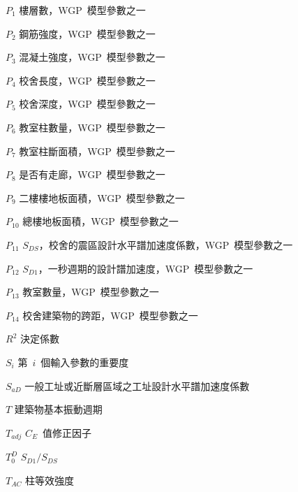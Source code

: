 \begin{SymEntry}
\item[$P_1$]
樓層數，WGP~模型參數之一

\item[$P_2$]
鋼筋強度，WGP~模型參數之一

\item[$P_3$]
混凝土強度，WGP~模型參數之一

\item[$P_4$]
校舍長度，WGP~模型參數之一

\item[$P_5$]
校舍深度，WGP~模型參數之一

\item[$P_6$]
教室柱數量，WGP~模型參數之一

\item[$P_7$]
教室柱斷面積，WGP~模型參數之一

\item[$P_8$]
是否有走廊，WGP~模型參數之一

\item[$P_9$]
二樓樓地板面積，WGP~模型參數之一

\item[$P_{10}$]
總樓地板面積，WGP~模型參數之一

\item[$P_{11}$]
$S_{DS}$，校舍的震區設計水平譜加速度係數，WGP~模型參數之一

\item[$P_{12}$]
$S_{D1}$，一秒週期的設計譜加速度，WGP~模型參數之一

\item[$P_{13}$]
教室數量，WGP~模型參數之一

\item[$P_{14}$]
校舍建築物的跨距，WGP~模型參數之一

\item[$R^2$]
決定係數

\item[$S_i$]
第~$i$~個輸入參數的重要度

\item[$S_{aD}$]
一般工址或近斷層區域之工址設計水平譜加速度係數

\item[$T$]
建築物基本振動週期

\item[$T_{adj}$]
$C_E$~值修正因子

\item[$T_0^D$]
$S_{D1}/S_{DS}$

\item[$T_{AC}$]
柱等效強度


\end{SymEntry}
